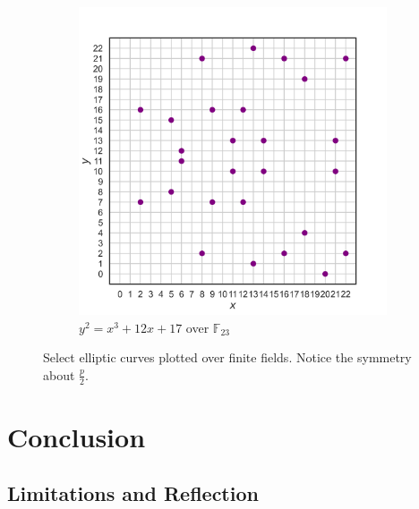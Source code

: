 \documentclass[11pt, a4paper]{report}
\newcommand{\field}{\mathbb{F}}
\begin{document}
\begin{figure}[ht]
\begin{subfigure}{0.49\textwidth}
\includegraphics[width = \textwidth]{krationalpoints23.png}
\caption{$y^2 = x^3 + 12x + 17$ over $\field_{23}$}
\label{fig:right}
\end{subfigure}
\caption{Select elliptic curves plotted over finite fields. Notice the symmetry about $\frac{p}{2}$.}
\label{fig:combined}
\end{figure}




\section{Conclusion}
\subsection{Limitations and Reflection}



\newpage 

\printbibliography
\end{document}
